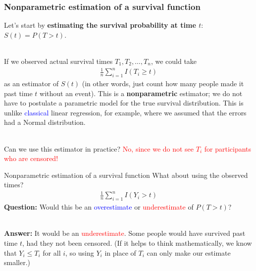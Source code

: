 \documentclass[10pt,t]{beamer}
\begin{document}
\begin{frame}
\frametitle{Nonparametric estimation of a survival function}
Let's start by \textbf{estimating the survival probability at time $t$}: $S(t) = P(T > t)$.
\\ ~\ 

If we observed actual survival times $T_1, T_2, \dots, T_n$, we could take
\begin{align*}
\frac{1}{n}\sum_{i=1}^n I(T_i \geq t)
\end{align*}
as an estimator of $S(t)$ (in other words, just count how many people made it past time $t$ without an event). This is a \textbf{nonparametric} estimator; we do not have to postulate a parametric model for the true survival distribution. This is unlike \textcolor{blue}{classical} linear regression, for example, where we assumed that the errors had a Normal distribution. 
\\ ~\ 

Can we use this estimator in practice? \pause \textcolor{red}{No, since we do not see $T_i$ for participants who are censored!}
\end{frame}

\begin{frame}{Nonparametric estimation of a survival function}
	What about using the observed times?
	\begin{align*}
		\frac{1}{n}\sum_{i=1}^{n}I(Y_i > t)
	\end{align*}
	\textbf{Question:} Would this be an \textcolor{blue}{overestimate} or \textcolor{red}{underestimate} of $P(T > t)$? \pause 
	\\ ~\ 
	
	\textbf{Answer:} It would be an \textcolor{red}{underestimate}. Some people would have survived past time $t$, had they not been censored. (If it helps to think mathematically, we know that $Y_i \leq T_i$ for all $i$, so using $Y_i$ in place of $T_i$ can only make our estimate smaller.)
\end{frame}
\end{document}
